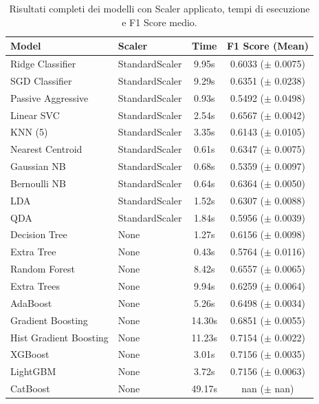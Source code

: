 \begin{table}[h]
\centering
\begin{tabular}{llcc}
\toprule
\textbf{Model} & \textbf{Scaler} & \textbf{Time} & \textbf{F1 Score (Mean)} \\
\midrule
Ridge Classifier & StandardScaler & 9.95s & 0.6033 (\(\pm\) 0.0075) \\
SGD Classifier & StandardScaler & 9.29s & 0.6351 (\(\pm\) 0.0238) \\
Passive Aggressive & StandardScaler & 0.93s & 0.5492 (\(\pm\) 0.0498) \\
Linear SVC & StandardScaler & 2.54s & 0.6567 (\(\pm\) 0.0042) \\
KNN (5) & StandardScaler & 3.35s & 0.6143 (\(\pm\) 0.0105) \\
Nearest Centroid & StandardScaler & 0.61s & 0.6347 (\(\pm\) 0.0075) \\
Gaussian NB & StandardScaler & 0.68s & 0.5359 (\(\pm\) 0.0097) \\
Bernoulli NB & StandardScaler & 0.64s & 0.6364 (\(\pm\) 0.0050) \\
LDA & StandardScaler & 1.52s & 0.6307 (\(\pm\) 0.0088) \\
QDA & StandardScaler & 1.84s & 0.5956 (\(\pm\) 0.0039) \\
Decision Tree & None & 1.27s & 0.6156 (\(\pm\) 0.0098) \\
Extra Tree & None & 0.43s & 0.5764 (\(\pm\) 0.0116) \\
Random Forest & None & 8.42s & 0.6557 (\(\pm\) 0.0065) \\
Extra Trees & None & 9.94s & 0.6259 (\(\pm\) 0.0064) \\
AdaBoost & None & 5.26s & 0.6498 (\(\pm\) 0.0034) \\
Gradient Boosting & None & 14.30s & 0.6851 (\(\pm\) 0.0055) \\
Hist Gradient Boosting & None & 11.23s & 0.7154 (\(\pm\) 0.0022) \\
XGBoost & None & 3.01s & 0.7156 (\(\pm\) 0.0035) \\
LightGBM & None & 3.72s & 0.7156 (\(\pm\) 0.0063) \\
CatBoost & None & 49.17s & nan (\(\pm\) nan) \\
\bottomrule
\end{tabular}
\caption{Risultati completi dei modelli con Scaler applicato, tempi di esecuzione e F1 Score medio.}
\label{tab:full_benchmark}
\end{table}




